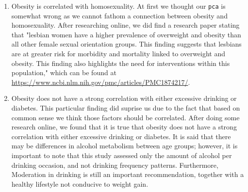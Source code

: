 \documentclass[english]{article}
\begin{document}
\begin{enumerate}
\item Obesity is correlated with homosexuality. At first we thought our \texttt{pca} is somewhat wrong as we cannot fathom a connection between obesity and homosexuality. After researching online, we did find a research paper stating that "lesbian women have a higher prevalence of overweight and obesity than all other female sexual orientation groups. This finding suggests that lesbians are at greater risk for morbidity and mortality linked to overweight and obesity. This finding also highlights the need for interventions within this population," which can be found at \url{https://www.ncbi.nlm.nih.gov/pmc/articles/PMC1874217/}.
\item Obesity does not have a strong correlation with either excessive drinking or diabetes. This particular finding did suprise us due to the fact that based on common sense we think those factors should be correlated. After doing some research online, we found that it is true that obesity does not have a strong correlation with either excessive drinking or diabetes. It is said that there may be differences in alcohol metabolism between age groups; however, it is important to note that this study assessed only the amount of alcohol per drinking occasion, and not drinking frequency patterns. Furthermore, Moderation in drinking is still an important recommendation, together with a healthy lifestyle not conducive to weight gain.
\end{enumerate}
\end{document}
